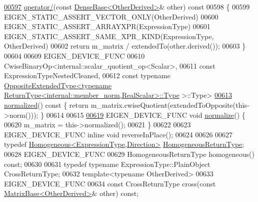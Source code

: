 \begin{DoxyCode}
\hyperlink{group___core___module_ae36a76f1da78cb2ea74447c86ac68580}{00597}     \hyperlink{group___core___module_ae36a76f1da78cb2ea74447c86ac68580}{operator/}(\textcolor{keyword}{const} \hyperlink{group___core___module_class_eigen_1_1_dense_base}{DenseBase<OtherDerived>}& other)\textcolor{keyword}{ const}
00598 \textcolor{keyword}{    }\{
00599       EIGEN\_STATIC\_ASSERT\_VECTOR\_ONLY(OtherDerived)
00600       EIGEN\_STATIC\_ASSERT\_ARRAYXPR(ExpressionType)
00601       EIGEN\_STATIC\_ASSERT\_SAME\_XPR\_KIND(ExpressionType, OtherDerived)
00602       \textcolor{keywordflow}{return} m\_matrix / extendedTo(other.derived());
00603     \}
00604 
00609     EIGEN\_DEVICE\_FUNC
00610     CwiseBinaryOp<internal::scalar\_quotient\_op<Scalar>,
00611                   \textcolor{keyword}{const} ExpressionTypeNestedCleaned,
00612                   \textcolor{keyword}{const} \textcolor{keyword}{typename} 
      \hyperlink{struct_eigen_1_1_vectorwise_op_1_1_opposite_extended_type}{OppositeExtendedType<typename ReturnType<internal::member\_norm,RealScalar>::Type}
      >::Type>
\hyperlink{group___core___module_a38799c77ec92e4b856804b7f0bc35c67}{00613}     \hyperlink{group___core___module_a38799c77ec92e4b856804b7f0bc35c67}{normalized}()\textcolor{keyword}{ const }\{ \textcolor{keywordflow}{return} m\_matrix.cwiseQuotient(extendedToOpposite(this->norm())); \}
00614 
00615 
\hyperlink{group___core___module_a1d22c9442537bd654edb4604db7b7b57}{00619}     EIGEN\_DEVICE\_FUNC \textcolor{keywordtype}{void} \hyperlink{group___core___module_a1d22c9442537bd654edb4604db7b7b57}{normalize}() \{
00620       m\_matrix = this->normalized();
00621     \}
00622 
00623     EIGEN\_DEVICE\_FUNC \textcolor{keyword}{inline} \textcolor{keywordtype}{void} reverseInPlace();
00624 
00626 
00627     \textcolor{keyword}{typedef} \hyperlink{group___geometry___module_class_eigen_1_1_homogeneous}{Homogeneous<ExpressionType,Direction>} 
      \hyperlink{group___geometry___module_class_eigen_1_1_homogeneous}{HomogeneousReturnType};
00628     EIGEN\_DEVICE\_FUNC
00629     HomogeneousReturnType homogeneous() \textcolor{keyword}{const};
00630 
00631     \textcolor{keyword}{typedef} \textcolor{keyword}{typename} ExpressionType::PlainObject CrossReturnType;
00632     \textcolor{keyword}{template}<\textcolor{keyword}{typename} OtherDerived>
00633     EIGEN\_DEVICE\_FUNC
00634     \textcolor{keyword}{const} CrossReturnType cross(\textcolor{keyword}{const} \hyperlink{group___core___module_class_eigen_1_1_matrix_base}{MatrixBase<OtherDerived>}& other) \textcolor{keyword}{const};

\end{DoxyCode}
